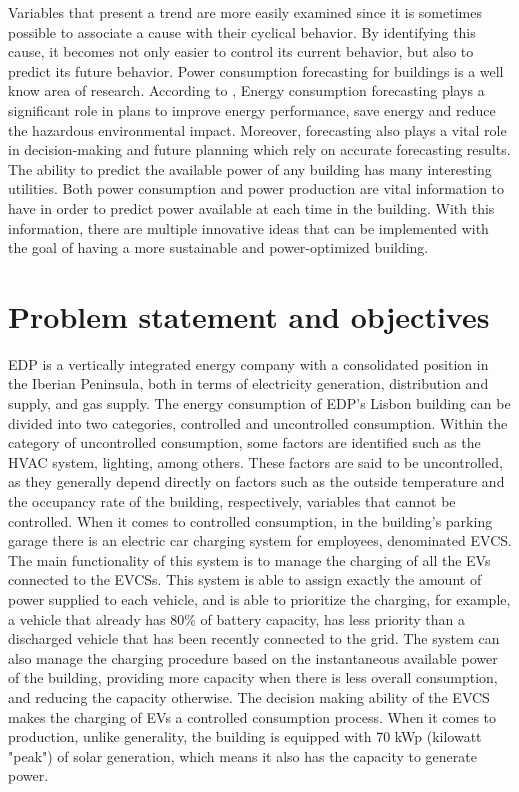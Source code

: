 Variables that present a trend are more easily examined since it is sometimes possible to associate a cause with their cyclical behavior. By identifying this cause, it becomes not only easier to control its current behavior, but also to predict its future behavior. Power consumption forecasting for buildings is a well know area of research. According to \cite{CivilEU}, Energy consumption forecasting plays a significant role in plans to improve energy performance, save energy and reduce the hazardous environmental impact. Moreover, forecasting also plays a vital role in decision-making and future planning which rely on accurate forecasting results. The ability to predict the available power of any building has many interesting utilities. Both power consumption and power production are vital information to have in order to predict power available at each time in the building. With this information, there are multiple innovative ideas that can be implemented with the goal of having a more sustainable and power-optimized building.



\section{Problem statement and objectives}


\ac{EDP} is a vertically integrated energy company with a consolidated position in the Iberian Peninsula, both in terms of electricity generation, distribution and supply, and gas supply. The energy consumption of \ac{EDP}'s Lisbon building can be divided into two categories, controlled and uncontrolled consumption. Within the category of uncontrolled consumption, some factors are identified such as the \ac{HVAC} system, lighting, among others. These factors are said to be uncontrolled, as they generally depend directly on factors such as the outside temperature and the occupancy rate of the building, respectively, variables that cannot be controlled. When it comes to controlled consumption, in the building's parking garage there is an electric car charging system for employees, denominated \ac{EVCS}. The main functionality of this system is to manage the charging of all the \ac{EV}s connected to the \ac{EVCSs}. This system is able to assign exactly the amount of power supplied to each vehicle, and is able to prioritize the charging, for example, a vehicle that already has 80$\%$ of battery capacity, has less priority than a discharged vehicle that has been recently connected to the grid. The system can also manage the charging procedure based on the instantaneous available power of the building, providing more capacity when there is less overall consumption, and reducing the capacity otherwise. The decision making ability of the \ac{EVCS} makes the charging of \ac{EV}s a controlled consumption process. When it comes to production, unlike generality, the building is equipped with 70 kWp (kilowatt "peak") of solar generation, which means it also has the capacity to generate power. 


